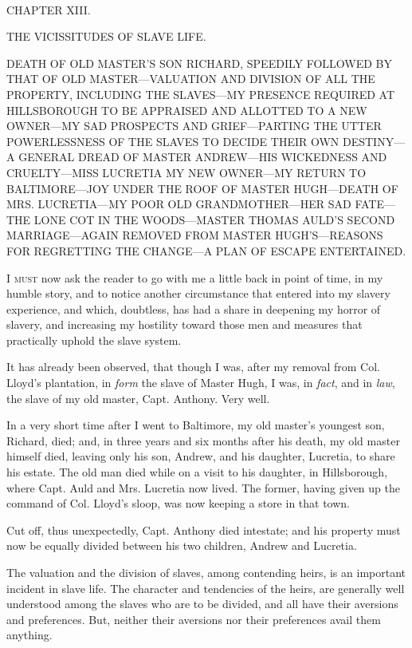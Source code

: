 {}

~

{CHAPTER XIII.}

THE VICISSITUDES OF SLAVE LIFE.

{DEATH OF OLD MASTER'S SON RICHARD, SPEEDILY FOLLOWED BY THAT OF OLD
MASTER---VALUATION AND DIVISION OF ALL THE PROPERTY, INCLUDING THE
SLAVES---MY PRESENCE REQUIRED AT HILLSBOROUGH TO BE APPRAISED AND
ALLOTTED TO A NEW OWNER---MY SAD PROSPECTS AND GRIEF---PARTING THE UTTER
POWERLESSNESS OF THE SLAVES TO DECIDE THEIR OWN DESTINY---A GENERAL
DREAD OF MASTER ANDREW---HIS WICKEDNESS AND CRUELTY---MISS LUCRETIA MY
NEW OWNER---MY RETURN TO BALTIMORE---JOY UNDER THE ROOF OF MASTER
HUGH---DEATH OF MRS. LUCRETIA---MY POOR OLD GRANDMOTHER---HER SAD
FATE---THE LONE COT IN THE WOODS---MASTER THOMAS AULD'S SECOND
MARRIAGE---AGAIN REMOVED FROM MASTER HUGH'S---REASONS FOR REGRETTING THE
CHANGE---A PLAN OF ESCAPE ENTERTAINED.}

\textsc{I must} now ask the reader to go with me a little back in point
of time, in my humble story, and to notice another circumstance that
entered into my slavery experience, and which, doubtless, has had a
share in deepening my horror of slavery, and increasing my hostility
toward those men and measures that practically uphold the slave system.

It has already been observed, that though I was, after my removal from
Col. Lloyd's plantation, in \emph{form} the slave of Master Hugh, I was,
in \emph{fact}, and in \emph{law}, the slave of my old master, Capt.
Anthony. Very well.

In a very short time after I went to Baltimore, my old master's youngest
son, Richard, died; and, in {}three years and six months after his
death, my old master himself died, leaving only his son, Andrew, and his
daughter, Lucretia, to share his estate. The old man died while on a
visit to his daughter, in Hillsborough, where Capt. Auld and Mrs.
Lucretia now lived. The former, having given up the command of Col.
Lloyd's sloop, was now keeping a store in that town.

Cut off, thus unexpectedly, Capt. Anthony died intestate; and his
property must now be equally divided between his two children, Andrew
and Lucretia.

The valuation and the division of slaves, among contending heirs, is an
important incident in slave life. The character and tendencies of the
heirs, are generally well understood among the slaves who are to be
divided, and all have their aversions and preferences. But, neither
their aversions nor their preferences avail them anything.

